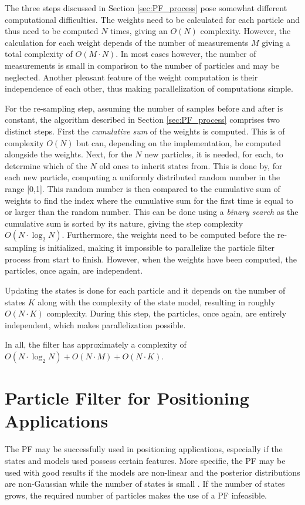 \documentclass{LTHthesis}
\begin{document}
The three steps discussed in Section \ref{sec:PF_process} pose somewhat different computational difficulties. The weights need to be calculated for each particle and thus need to be computed $N$ times, giving an $O(N)$ complexity. However, the calculation for each weight depends of the number of measurements $M$ giving a total complexity of $O(M\cdot N)$. In most cases however, the number of measurements is small in comparison to the number of particles and may be neglected. Another pleasant feature of the weight computation is their independence of each other, thus making parallelization of computations simple.

For the re-sampling step, assuming the number of samples before and after is constant, the algorithm described in Section \ref{sec:PF_process} comprises two distinct steps. First the \emph{cumulative sum} of the weights is computed. This is of complexity $O(N)$ but can, depending on the implementation, be computed alongside the weights. Next, for the $N$ new particles, it is needed, for each, to determine which of the $N$ old ones to inherit states from. This is done by, for each new particle, computing a uniformly distributed random number in the range [0,1]. This random number is then compared to the cumulative sum of weights to find the index where the cumulative sum for the first time is equal to or larger than the random number. This can be done using a \emph{binary search} as the cumulative sum is sorted by its nature, giving the step complexity $O(N\cdot\log_2{N})$. Furthermore, the weights need to be computed before the re-sampling is initialized, making it impossible to parallelize the particle filter process from start to finish. However, when the weights have been computed, the particles, once again, are independent. 

Updating the states is done for each particle and it depends on the number of states $K$ along with the complexity of the state model, resulting in roughly $O(N \cdot K)$ complexity. During this step, the particles, once again, are entirely independent, which makes parallelization possible.

In all, the filter has approximately a complexity of $O(N\cdot\log_2{N}) + O(N\cdot M) + O(N\cdot K)$.
%
\section{Particle Filter for Positioning Applications}
%
The PF may be successfully used in positioning applications, especially if the states and models used possess certain features. More specific, the PF may be used with good results if the models are non-linear and the posterior distributions are non-Gaussian while the number of states is small \cite{gson12}. If the number of states grows, the required number of particles makes the use of a PF infeasible.
\end{document}
